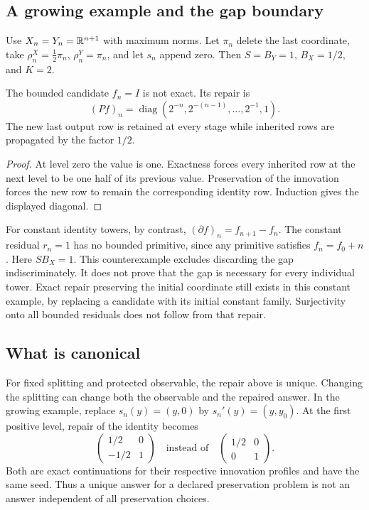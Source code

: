 \subsection{A growing example and the gap boundary}
Use \(X_n=Y_n=\mathbb R^{n+1}\) with maximum norms. Let \(\pi_n\) delete the last coordinate, take \(\rho^X_n=\tfrac12\pi_n\), \(\rho^Y_n=\pi_n\), and let \(s_n\) append zero. Then \(S=B_Y=1\), \(B_X=1/2\), and \(K=2\).

\begin{example}\label{KS22}
The bounded candidate \(f_n=I\) is not exact. Its repair is
\[
 (Pf)_n=\operatorname{diag}(2^{-n},2^{-(n-1)},\ldots,2^{-1},1).
\]
The new last output row is retained at every stage while inherited rows are propagated by the factor \(1/2\).
\end{example}
\begin{proof}
At level zero the value is one. Exactness forces every inherited row at the next level to be one half of its previous value. Preservation of the innovation forces the new row to remain the corresponding identity row. Induction gives the displayed diagonal.
\end{proof}
For constant identity towers, by contrast, \((\partial f)_n=f_{n+1}-f_n\). The constant residual \(r_n=1\) has no bounded primitive, since any primitive satisfies \(f_n=f_0+n\). Here \(SB_X=1\). This counterexample excludes discarding the gap indiscriminately. It does not prove that the gap is necessary for every individual tower. Exact repair preserving the initial coordinate still exists in this constant example, by replacing a candidate with its initial constant family. Surjectivity onto all bounded residuals does not follow from that repair.

\subsection{What is canonical}
For fixed splitting and protected observable, the repair above is unique. Changing the splitting can change both the observable and the repaired answer. In the growing example, replace \(s_n(y)=(y,0)\) by \(s_n'(y)=(y,y_0)\). At the first positive level, repair of the identity becomes
\[
 \begin{pmatrix}1/2&0\\-1/2&1\end{pmatrix}
 \quad\text{instead of}\quad
 \begin{pmatrix}1/2&0\\0&1\end{pmatrix}.
\]
Both are exact continuations for their respective innovation profiles and have the same seed. Thus a unique answer for a declared preservation problem is not an answer independent of all preservation choices.

